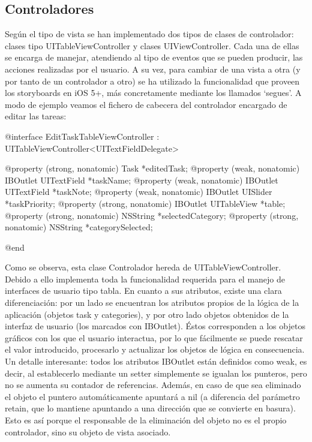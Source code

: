 \documentclass[parskip=half*]{scrartcl}
\begin{document}
\subsection{Controladores}

Seg\'un el tipo de vista se han implementado dos tipos de clases de controlador: clases tipo UITableViewController y clases UIViewController. Cada una de ellas se encarga de manejar, atendiendo al tipo de eventos que se pueden producir, las acciones realizadas por el usuario. A su vez, para cambiar de una vista a otra (y por tanto de un controlador a otro) se ha utilizado la funcionalidad que proveen los storyboards en iOS 5+, m\'as concretamente mediante los llamados `segues'.
A modo de ejemplo veamos el fichero de cabecera del controlador encargado de editar las tareas:

\begin{verbatimtab}
@interface EditTaskTableViewController : UITableViewController<UITextFieldDelegate>

@property (strong, nonatomic) Task *editedTask;
@property (weak, nonatomic) IBOutlet UITextField *taskName;
@property (weak, nonatomic) IBOutlet UITextField *taskNote;
@property (weak, nonatomic) IBOutlet UISlider *taskPriority;
@property (strong, nonatomic) IBOutlet UITableView *table;
@property (strong, nonatomic) NSString *selectedCategory;
@property (strong, nonatomic) NSString *categorySelected;

@end
\end{verbatimtab}

Como se observa, esta clase Controlador hereda de UITableViewController. Debido a ello implementa toda la funcionalidad requerida para el manejo de interfaces de usuario tipo tabla. En cuanto a sus atributos, existe una clara diferenciaci\'on: por un lado se encuentran los atributos propios de la l\'ogica de la aplicaci\'on (objetos task y categories), y por otro lado objetos obtenidos de la interfaz de usuario (los marcados con IBOutlet). \'Estos corresponden a los objetos gr\'aficos con los que el usuario interactua, por lo que f\'acilmente se puede rescatar el valor introducido, procesarlo y actualizar los objetos de l\'ogica en consecuencia. Un detalle interesante: todos los atributos IBOutlet est\'an definidos como weak, es decir, al establecerlo mediante un setter simplemente se igualan los punteros, pero no se aumenta su contador de referencias. Adem\'as, en caso de que sea eliminado el objeto el puntero autom\'aticamente apuntar\'a a nil (a diferencia del par\'ametro retain, que lo mantiene apuntando a una direcci\'on que se convierte en basura). Esto es as\'i porque el responsable de la eliminaci\'on del objeto no es el propio controlador, sino su objeto de vista asociado.
\end{document}
